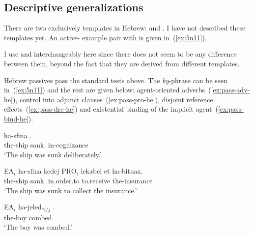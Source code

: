 \begin{exe}
\begin{xlist}
\begin{exe}
\begin{xlist}
\begin{exe}
\begin{exe}
\begin{xlist}
\begin{exe}
	\subsection{Descriptive generalizations} \label{passn:pass:tpua}
There are two exclusively  templates in Hebrew: {\tpua} and {\thuf}. I have not described these templates yet. An active- example pair with {\tpua} is given in~(\ref{ex:5n11}).
 \begin{exe}
 \ex  \label{ex:5n11}
 \begin{xlist} 
	
	
 \z
\z 

I use {\tpua} and {\thuf} interchangeably here since there does not seem to be any difference between them, beyond the fact that they are derived from different templates.

Hebrew passives pass the standard tests above. The \emph{by}-phrase can be seen in~(\ref{ex:5n11}) and the rest are given below: agent-oriented adverbs~(\ref{ex:pass-adv-he}), control into adjunct clauses~(\ref{ex:pass-pro-he}), disjoint reference effects~(\ref{ex:pass-dre-he}) and existential binding of the implicit agent~(\ref{ex:pass-bind-he}).
 \begin{exe}
\ex  \label{ex:pass-adv-he}  
	{ \gll ha-sfina  .\\
 	  the-ship sank. in-cognizance\\
 	\glt `The ship was sunk deliberately.' } 
	
\ex  \label{ex:pass-pro-he}  
 	{ \gll EA$_i$ ha-sfina  kedej PRO$_i$ lekabel et ha-bituax.\\
 	  {} the-ship sank. in.order.to {} to.receive  the-insurance\\
 	\glt `The ship was sunk to collect the insurance.' } 
	
\ex  \label{ex:pass-dre-he} 
		{ \gll EA$_i$ ha-jeled$_{*i/j}$ .\\
 	  {} the-boy combed.\\
 	\glt `The boy was combed.' } 
	

\end{exe}
\end{xlist}
\end{exe}
\end{exe}
\end{xlist}
\end{exe}
\end{exe}
\end{xlist}
\end{exe}
\end{xlist}
\end{exe}
